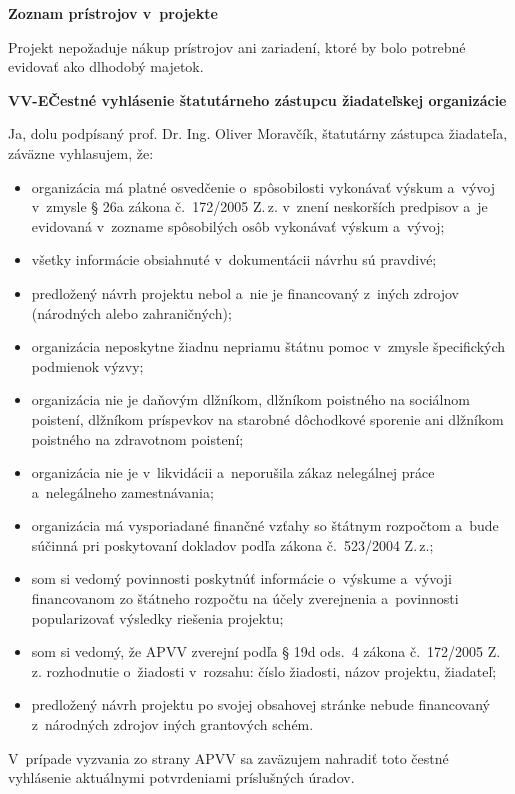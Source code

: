 \documentclass[10pt,a4paper]{article}
\newcommand{\cast}[2]{%
  \par\medskip
  \noindent\colorbox{black!10}{\parbox{\dimexpr\linewidth-2\fboxsep}{%
    \textbf{#1}\hfill\textbf{#2}}}\par\smallskip}
\begin{document}
\textbf{Zoznam prístrojov v~projekte}

Projekt nepožaduje nákup prístrojov ani zariadení, ktoré by bolo potrebné
evidovať ako dlhodobý majetok.

\cast{VV-E}{Čestné vyhlásenie štatutárneho zástupcu žiadateľskej organizácie}

Ja, dolu podpísaný prof. Dr. Ing. Oliver Moravčík, štatutárny zástupca
žiadateľa, záväzne vyhlasujem, že:

\begin{itemize}[nosep,leftmargin=*]
  \item organizácia má platné osvedčenie o~spôsobilosti vykonávať výskum
    a~vývoj v~zmysle § 26a zákona č.~172/2005 Z.\,z. v~znení neskorších
    predpisov a~je evidovaná v~zozname spôsobilých osôb vykonávať výskum
    a~vývoj;
  \item všetky informácie obsiahnuté v~dokumentácii návrhu sú pravdivé;
  \item predložený návrh projektu nebol a~nie je financovaný z~iných zdrojov
    (národných alebo zahraničných);
  \item organizácia neposkytne žiadnu nepriamu štátnu pomoc v~zmysle
    špecifických podmienok výzvy;
  \item organizácia nie je daňovým dlžníkom, dlžníkom poistného na
    sociálnom poistení, dlžníkom príspevkov na starobné dôchodkové
    sporenie ani dlžníkom poistného na zdravotnom poistení;
  \item organizácia nie je v~likvidácii a~neporušila zákaz nelegálnej práce
    a~nelegálneho zamestnávania;
  \item organizácia má vysporiadané finančné vzťahy so štátnym rozpočtom
    a~bude súčinná pri poskytovaní dokladov podľa zákona č.~523/2004 Z.\,z.;
  \item som si vedomý povinnosti poskytnúť informácie o~výskume a~vývoji
    financovanom zo štátneho rozpočtu na účely zverejnenia a~povinnosti
    popularizovať výsledky riešenia projektu;
  \item som si vedomý, že APVV zverejní podľa § 19d ods.~4 zákona
    č.~172/2005 Z.\,z. rozhodnutie o~žiadosti v~rozsahu: číslo žiadosti,
    názov projektu, žiadateľ;
  \item predložený návrh projektu po svojej obsahovej stránke nebude
    financovaný z~národných zdrojov iných grantových schém.
\end{itemize}

V~prípade vyzvania zo strany APVV sa zaväzujem nahradiť toto čestné
vyhlásenie aktuálnymi potvrdeniami príslušných úradov.
\end{document}

